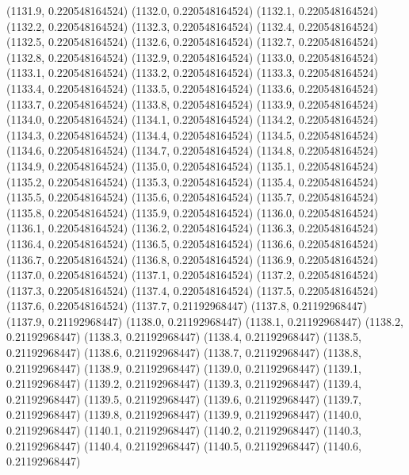 {					(1131.9, 0.220548164524)
					(1132.0, 0.220548164524)
					(1132.1, 0.220548164524)
					(1132.2, 0.220548164524)
					(1132.3, 0.220548164524)
					(1132.4, 0.220548164524)
					(1132.5, 0.220548164524)
					(1132.6, 0.220548164524)
					(1132.7, 0.220548164524)
					(1132.8, 0.220548164524)
					(1132.9, 0.220548164524)
					(1133.0, 0.220548164524)
					(1133.1, 0.220548164524)
					(1133.2, 0.220548164524)
					(1133.3, 0.220548164524)
					(1133.4, 0.220548164524)
					(1133.5, 0.220548164524)
					(1133.6, 0.220548164524)
					(1133.7, 0.220548164524)
					(1133.8, 0.220548164524)
					(1133.9, 0.220548164524)
					(1134.0, 0.220548164524)
					(1134.1, 0.220548164524)
					(1134.2, 0.220548164524)
					(1134.3, 0.220548164524)
					(1134.4, 0.220548164524)
					(1134.5, 0.220548164524)
					(1134.6, 0.220548164524)
					(1134.7, 0.220548164524)
					(1134.8, 0.220548164524)
					(1134.9, 0.220548164524)
					(1135.0, 0.220548164524)
					(1135.1, 0.220548164524)
					(1135.2, 0.220548164524)
					(1135.3, 0.220548164524)
					(1135.4, 0.220548164524)
					(1135.5, 0.220548164524)
					(1135.6, 0.220548164524)
					(1135.7, 0.220548164524)
					(1135.8, 0.220548164524)
					(1135.9, 0.220548164524)
					(1136.0, 0.220548164524)
					(1136.1, 0.220548164524)
					(1136.2, 0.220548164524)
					(1136.3, 0.220548164524)
					(1136.4, 0.220548164524)
					(1136.5, 0.220548164524)
					(1136.6, 0.220548164524)
					(1136.7, 0.220548164524)
					(1136.8, 0.220548164524)
					(1136.9, 0.220548164524)
					(1137.0, 0.220548164524)
					(1137.1, 0.220548164524)
					(1137.2, 0.220548164524)
					(1137.3, 0.220548164524)
					(1137.4, 0.220548164524)
					(1137.5, 0.220548164524)
					(1137.6, 0.220548164524)
					(1137.7, 0.21192968447)
					(1137.8, 0.21192968447)
					(1137.9, 0.21192968447)
					(1138.0, 0.21192968447)
					(1138.1, 0.21192968447)
					(1138.2, 0.21192968447)
					(1138.3, 0.21192968447)
					(1138.4, 0.21192968447)
					(1138.5, 0.21192968447)
					(1138.6, 0.21192968447)
					(1138.7, 0.21192968447)
					(1138.8, 0.21192968447)
					(1138.9, 0.21192968447)
					(1139.0, 0.21192968447)
					(1139.1, 0.21192968447)
					(1139.2, 0.21192968447)
					(1139.3, 0.21192968447)
					(1139.4, 0.21192968447)
					(1139.5, 0.21192968447)
					(1139.6, 0.21192968447)
					(1139.7, 0.21192968447)
					(1139.8, 0.21192968447)
					(1139.9, 0.21192968447)
					(1140.0, 0.21192968447)
					(1140.1, 0.21192968447)
					(1140.2, 0.21192968447)
					(1140.3, 0.21192968447)
					(1140.4, 0.21192968447)
					(1140.5, 0.21192968447)
					(1140.6, 0.21192968447)
}
